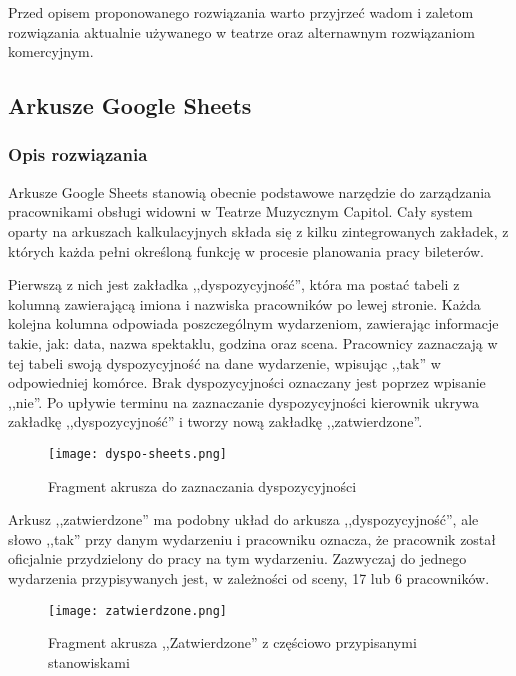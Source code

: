 \documentclass[shortabstract]{iithesis}
\begin{document}
Przed opisem proponowanego rozwiązania warto przyjrzeć wadom i zaletom rozwiązania aktualnie używanego w teatrze oraz alternawnym rozwiązaniom komercyjnym.

\subsection{Arkusze Google Sheets}

\subsubsection{Opis rozwiązania}
Arkusze Google Sheets stanowią obecnie podstawowe narzędzie do zarządzania pracownikami obsługi widowni w Teatrze Muzycznym Capitol. Cały system oparty na arkuszach kalkulacyjnych składa się z kilku zintegrowanych zakładek, z których każda pełni określoną funkcję w procesie planowania pracy bileterów.

Pierwszą z nich jest zakładka ,,dyspozycyjność'', która ma postać tabeli z kolumną zawierającą imiona i nazwiska pracowników po lewej stronie. Każda kolejna kolumna odpowiada poszczególnym wydarzeniom, zawierając informacje takie, jak: data, nazwa spektaklu, godzina oraz scena. Pracownicy zaznaczają w tej tabeli swoją dyspozycyjność na dane wydarzenie, wpisując ,,tak'' w odpowiedniej komórce. Brak dyspozycyjności oznaczany jest poprzez wpisanie ,,nie''. Po upływie terminu na zaznaczanie dyspozycyjności kierownik ukrywa zakładkę ,,dyspozycyjność'' i tworzy nową zakładkę ,,zatwierdzone''.


\begin{figure}[h] %
\centering %
\texttt{[image: dyspo-sheets.png]} %
\caption{Fragment akrusza do zaznaczania dyspozycyjności} %
\end{figure}


Arkusz ,,zatwierdzone'' ma podobny układ do arkusza ,,dyspozycyjność'', ale słowo ,,tak'' przy danym wydarzeniu i pracowniku oznacza, że pracownik został oficjalnie przydzielony do pracy na tym wydarzeniu. Zazwyczaj do jednego wydarzenia przypisywanych jest, w zależności od sceny, 17 lub 6 pracowników.

\begin{figure}[h] %
\centering %
\texttt{[image: zatwierdzone.png]} %
\caption{Fragment akrusza ,,Zatwierdzone'' z częściowo przypisanymi stanowiskami} %
\label{fig:dyspo} %
\end{figure}
\end{document}
